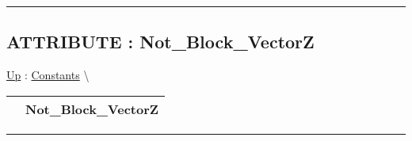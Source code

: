 \par


\rule{\linewidth}{0.5pt}
\subsection*{ATTRIBUTE : Not\_Block\_VectorZ}
\hypertarget{ecldoc:pbblas.constants.not_block_vectorz}{}
\hyperlink{ecldoc:PBblas.Constants}{Up} :
\hspace{0pt} \hyperlink{ecldoc:PBblas.Constants}{Constants} \textbackslash 

{\renewcommand{\arraystretch}{1.5}
\begin{tabularx}{\textwidth}{|>{\raggedright\arraybackslash}l|X|}
\hline
\hspace{0pt} & Not\_Block\_VectorZ \\
\hline
\end{tabularx}
}

\par


\rule{\linewidth}{0.5pt}


